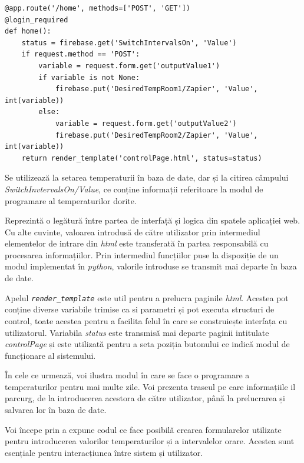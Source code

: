 \vspace{1em}
\begin{lstlisting}
@app.route('/home', methods=['POST', 'GET'])
@login_required
def home():
    status = firebase.get('SwitchIntervalsOn', 'Value')
    if request.method == 'POST':
        variable = request.form.get('outputValue1')
        if variable is not None:
            firebase.put('DesiredTempRoom1/Zapier', 'Value', int(variable))
        else:
            variable = request.form.get('outputValue2')
            firebase.put('DesiredTempRoom2/Zapier', 'Value', int(variable))
    return render_template('controlPage.html', status=status)
\end{lstlisting}
\vspace{2em} 


	 Se utilizează la setarea temperaturii în baza de date, dar și la citirea câmpului \textit{SwitchInvtervalsOn/Value}, ce conține informații referitoare la modul de programare al temperaturilor dorite. 

	Reprezintă o legătură între partea de interfață și logica din spatele aplicației web. Cu alte cuvinte, valoarea introdusă de către utilizator prin intermediul elementelor de intrare din \textit{html} este transferată în partea responsabilă cu procesarea informațiilor. Prin intermediul funcțiilor puse la dispoziție de un modul implementat în \textit{python}, valorile introduse se transmit mai departe în baza de date.

	Apelul \textit{\texttt{render\_template}} este util pentru a prelucra paginile \textit{html}. Acestea pot conține diverse variabile trimise ca si parametri și pot executa structuri de control, toate acestea pentru a facilita felul în care se construiește interfața cu utilizatorul. Variabila \textit{status} este transmisă mai departe paginii intitulate \textit{controlPage} și este utilizată pentru a seta poziția butonului ce indică modul de funcționare al sistemului.

\vspace{2em}

	În cele ce urmează, voi ilustra modul în care se face o programare a temperaturilor pentru mai multe zile. Voi prezenta traseul pe care informațiile il parcurg, de la introducerea acestora de către utilizator, până la prelucrarea și salvarea lor în baza de date.

	Voi începe prin a expune codul ce face posibilă crearea formularelor utilizate pentru introducerea valorilor temperaturilor și a intervalelor orare. Acestea sunt esențiale pentru interacțiunea între sistem și utilizator.  

